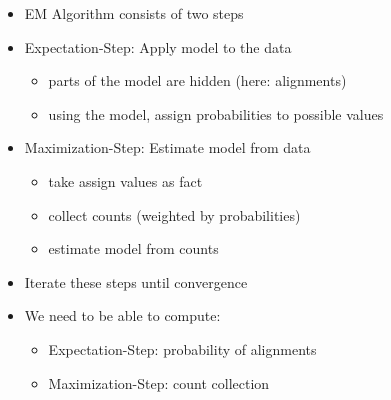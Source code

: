 \documentclass[landscape]{slides}
\begin{document}

\vspace{5mm}
\begin{itemize}
\item EM Algorithm consists of two steps
\item Expectation-Step: Apply model to the data
\begin{itemize}
\item parts of the model are hidden (here: alignments)
\item using the model, assign probabilities to possible values
\end{itemize}
\item Maximization-Step: Estimate model from data
\begin{itemize}
\item take assign values as fact
\item collect counts (weighted by probabilities)
\item estimate model from counts
\end{itemize}
\item Iterate these steps until convergence
\end{itemize}



\vspace{30mm}
\begin{itemize}
\item We need to be able to compute:\vspace{10mm}
\begin{itemize}
\item Expectation-Step: probability of alignments\vspace{10mm}
\item Maximization-Step: count collection
\end{itemize}
\end{itemize}


\end{document}

